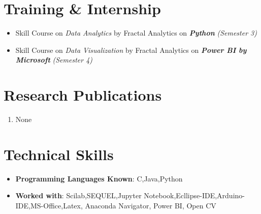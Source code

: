 \documentclass[11pt,a4paper,sans]{moderncv}   %
\begin{document}
\section{Training \& Internship}

\begin{itemize}
	
	\item Skill Course on \textit{Data Analytics} by Fractal Analytics on \textbf{\textit{Python}}\textit{ (Semester 3) } \newline
	
	\item Skill Course on \textit{Data Visualization} by Fractal Analytics on \textbf{\textit{Power BI by Microsoft}}\textit{ (Semester 4) } \newline
	
	
\end{itemize}


\section{Research Publications}

\begin{enumerate}
	
	\item None \newline		
\end{enumerate}


\section{Technical Skills}

\begin{itemize}
	\item\textbf{Programming Languages Known}: C,Java,Python \newline
	
	\item \textbf{Worked with}: Scilab,SEQUEL,Jupyter Notebook,Ecllipse-IDE,Arduino-IDE,MS-Office,Latex, Anaconda Navigator, Power BI, Open CV \newline
	
	\end {itemize}
	
\end{document}
